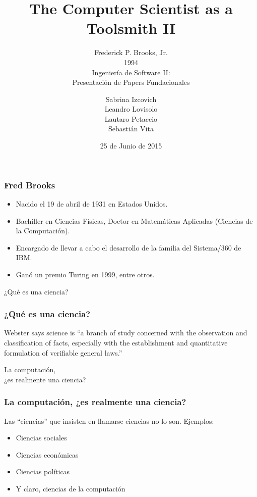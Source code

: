 \documentclass[spanish]{beamer}
\title{The Computer Scientist as a Toolsmith II}
\subtitle{
  Frederick P. Brooks, Jr. \\
  1994 \\
  \vspace{2em}
  Ingeniería de Software II: \\
  Presentación de Papers Fundacionales
}
\author{
  Sabrina Izcovich \\
  Leandro Lovisolo \\
  Lautaro Petaccio \\
  Sebastián Vita
}
\date{25 de Junio de 2015}
\institute{
  Departamento de Computación \\
  Facultad de Ciencias Exactas y Naturales \\
  Universidad de Buenos Aires
}
\begin{document}
\begin{frame}
  \titlepage
\end{frame}

\begin{frame}
  \begin{center}
 	 \frametitle{Fred Brooks}
    	\begin{itemize}
    		\item Nacido el 19 de abril de 1931 en Estados Unidos.
    		\item Bachiller en Ciencias Físicas, Doctor en Matemáticas Aplicadas (Ciencias de la Computación).
    		\item Encargado de llevar a cabo el desarrollo de la familia del Sistema/360 de IBM.
    		\item Ganó un premio Turing en 1999, entre otros.
    	\end{itemize}
  \end{center}
\end{frame}

\begin{frame}
  \begin{center}
    \Huge{
      ¿Qué es una ciencia?
    }
  \end{center}
\end{frame}

\begin{frame}
  \frametitle{¿Qué es una ciencia?}

  Webster says science is ``a branch of study concerned
  with the observation and classification of facts, especially
  with the establishment and quantitative formulation
  of verifiable general laws.''
\end{frame}

\begin{frame}
  \begin{center}
    \Huge{
      La computación,\\
      ¿es realmente una ciencia?
    }
  \end{center}
\end{frame}

\begin{frame}
  \frametitle{La computación, ¿es realmente una ciencia?}

  Las ``ciencias'' que insisten en llamarse ciencias no lo son.
  \pause
  Ejemplos:
  \pause

  \begin{itemize}
    \item Ciencias sociales \pause
    \item Ciencias económicas \pause
    \item Ciencias políticas \pause
    \item Y claro, ciencias de la computación
  \end{itemize}
\end{frame}
\end{document}
